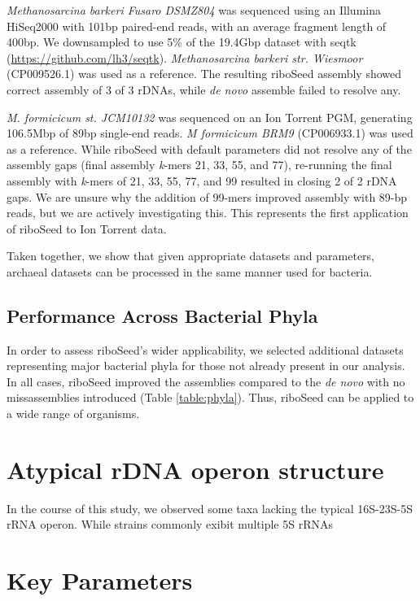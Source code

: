 \documentclass[10pt]{article}
\begin{document}
\textit{Methanosarcina barkeri Fusaro DSMZ804} was sequenced using an Illumina HiSeq2000 with 101bp paired-end reads, with an average fragment length of 400bp. We downsampled to use 5\% of the 19.4Gbp dataset with seqtk (\href{https://github.com/lh3/seqtk}{https://github.com/lh3/seqtk}). \textit{Methanosarcina barkeri str. Wiesmoor} (CP009526.1) was used as a reference. The resulting riboSeed assembly showed correct assembly of 3 of 3 rDNAs, while \textit{de novo} assemble failed to resolve any.

\textit{M. formicicum st. JCM10132} was sequenced on an Ion Torrent PGM, generating 106.5Mbp of 89bp single-end reads. \textit{M formicicum BRM9} (CP006933.1) was used as a reference. While riboSeed with default parameters did not resolve any of the assembly gaps (final assembly \textit{k}-mers 21, 33, 55, and 77), re-running the final assembly with \textit{k}-mers of 21, 33, 55, 77, and 99 resulted in closing 2 of 2 rDNA gaps. We are unsure why the addition of 99-mers improved assembly with 89-bp reads, but we are actively investigating this. This represents the first application of riboSeed to Ion Torrent data.

Taken together, we show that given appropriate datasets and parameters, archaeal datasets can be processed in the same manner used for bacteria.

\subsection*{Performance Across Bacterial Phyla}
In order to assess riboSeed's wider applicability, we selected additional datasets representing major bacterial phyla for those not already present in our analysis. In all cases, riboSeed improved the assemblies compared to the \textit{de novo} with no missassemblies introduced (Table \ref{table:phyla}). Thus, riboSeed can be applied to a wide range of organisms.





\section*{Atypical rDNA operon structure}
In the course of this study, we observed some taxa lacking the typical 16S-23S-5S rRNA operon.  While strains commonly exibit multiple 5S rRNAs




\section*{Key Parameters}
\end{document}
